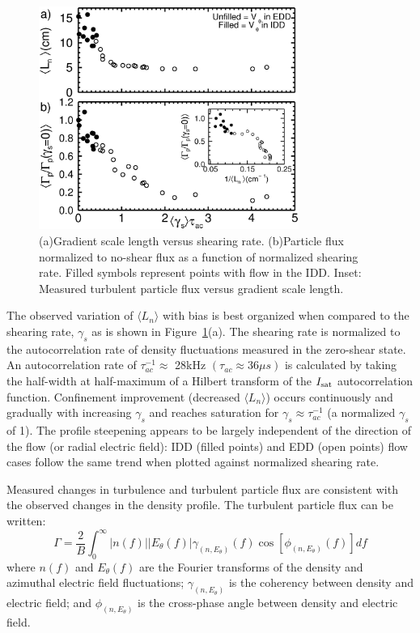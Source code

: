 \documentclass[aps,prl,amsmath,amssymb,reprint,superscriptaddress]{revtex4-1} %
\begin{document}
\begin{figure}[!htbp]
\centerline{
\includegraphics[width=8.5cm]{sheargradflux.eps}}
\caption{\label{fig:sheargradflux} (a)Gradient scale length versus shearing rate. (b)Particle flux normalized to no-shear
  flux as a function of normalized shearing rate. Filled symbols
  represent points with flow in the IDD. Inset: Measured turbulent particle flux versus
  gradient scale length.}
\end{figure}

The observed variation of $\langle L_{n} \rangle$ with bias is best
organized when compared to the shearing rate, $\gamma_{s}$ as is
shown in Figure~\ref{fig:sheargradflux}(a).   The shearing rate is
normalized to the autocorrelation rate of density fluctuations
measured in the zero-shear state.  An autocorrelation rate of $\tau_{ac}^{-1} \approx $ 28kHz $(\tau_{ac} \approx 36\mu s)$ is calculated by taking the half-width at
half-maximum of a Hilbert transform of the $I_{\rm sat}$
autocorrelation function.  Confinement improvement (decreased $\langle
L_n \rangle$) occurs continuously and gradually with increasing
$\gamma_{s}$ and reaches saturation for $\gamma_{s} \approx \tau_{ac}^{-1}$ (a normalized $\gamma_{s}$ of 1).  The profile steepening
appears to be largely independent of the direction of the flow (or radial electric field): IDD (filled points) and EDD (open points) flow cases follow the same trend when plotted against normalized shearing rate.

Measured changes in turbulence and turbulent particle flux are
consistent with the observed changes in the density profile.  The
turbulent particle flux can be written\cite{powers74}:
\begin{equation}
\Gamma = \frac{2}{B} \int^{\infty}_{0} \lvert n(f) \rvert \lvert E_{\theta}(f) \rvert \gamma_{(n,E_{\theta})}(f) \cos [\phi_{(n,E_{\theta})}(f)] df
\label{eq:fluxint}
\end{equation}
where $n(f)$ and $E_\theta(f)$ are the Fourier transforms of
the density and azimuthal electric field fluctuations;
$\gamma_{(n,E_\theta)}$ is the coherency between density and electric
field; and $\phi_{(n,E_\theta)}$ is the cross-phase angle between
density and electric field.
\end{document}
